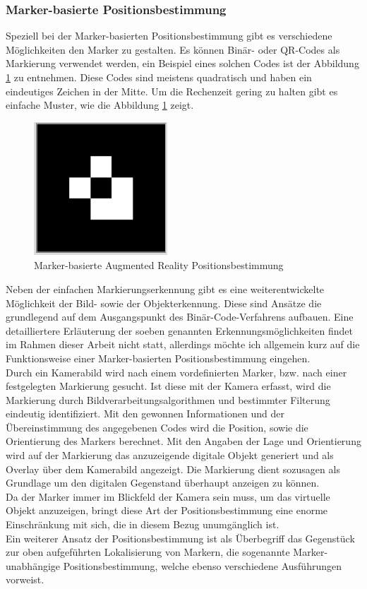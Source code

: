 \subsubsection*{Marker-basierte Positionsbestimmung}
Speziell bei der Marker-basierten Positionsbestimmung gibt es verschiedene Möglichkeiten den Marker zu gestalten. Es können 
Binär- oder QR-Codes als Markierung verwendet werden, ein Beispiel eines solchen Codes ist der Abbildung \ref{pic:markerARpos} zu entnehmen. 
Diese Codes sind meistens quadratisch und haben ein eindeutiges Zeichen in der Mitte. Um die Rechenzeit gering zu halten gibt es einfache Muster, 
wie die Abbildung \ref{pic:markerARpos} zeigt.
\begin{figure}[hbt!]
    \centering
    \includegraphics[width=5cm,height=5cm,keepaspectratio]{2Grundlagen/Bilder/bildmarkerAR.png}
    \caption{Marker-basierte Augmented Reality Positionsbestimmung}
    \label{pic:markerARpos}
\end{figure}
Neben der einfachen Markierungserkennung gibt es eine weiterentwickelte Möglichkeit der Bild- sowie der Objekterkennung. Diese sind Ansätze 
die grundlegend auf dem Ausgangspunkt des Binär-Code-Verfahrens aufbauen. Eine detailliertere Erläuterung der soeben genannten 
Erkennungsmöglichkeiten findet im Rahmen dieser Arbeit nicht statt, allerdings möchte ich allgemein kurz auf die Funktionsweise einer 
Marker-basierten Positionsbestimmung eingehen.
\\ 
Durch ein Kamerabild wird nach einem vordefinierten Marker, bzw. nach einer festgelegten Markierung gesucht. Ist diese mit der Kamera erfasst, 
wird die Markierung durch Bildverarbeitungsalgorithmen und bestimmter Filterung eindeutig identifiziert. Mit den gewonnen Informationen und 
der Übereinstimmung des angegebenen Codes wird die Position, sowie die Orientierung des Markers berechnet. Mit den Angaben der Lage und 
Orientierung wird auf der Markierung das anzuzeigende digitale Objekt generiert und als Overlay über dem Kamerabild angezeigt. Die Markierung 
dient sozusagen als Grundlage um den digitalen Gegenstand überhaupt anzeigen zu können.
\\ 
Da der Marker immer im Blickfeld der Kamera sein muss, um das virtuelle Objekt anzuzeigen, bringt diese Art der Positionsbestimmung eine 
enorme Einschränkung mit sich, die in diesem Bezug unumgänglich ist. 
\\ 
\linebreak
Ein weiterer Ansatz der Positionsbestimmung ist als Überbegriff das Gegenstück zur oben aufgeführten Lokalisierung von Markern, die 
sogenannte Marker-unabhängige Positionsbestimmung, welche ebenso verschiedene Ausführungen vorweist. 
